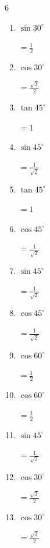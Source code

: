 \begin{multicols}{6}
\begin{enumerate}
  \item $\displaystyle \sin{30^\circ}$

        $\displaystyle =\frac{1}{2}$

  \item $\displaystyle \cos{30^\circ}$

        $\displaystyle =\frac{\sqrt{3}}{2}$

  \item $\displaystyle \tan{45^\circ}$

        $\displaystyle =1$

  \item $\displaystyle \sin{45^\circ}$

        $\displaystyle =\frac{1}{\sqrt{2}}$

  \item $\displaystyle \tan{45^\circ}$

        $\displaystyle =1$

  \item $\displaystyle \cos{45^\circ}$

        $\displaystyle =\frac{1}{\sqrt{2}}$

  \item $\displaystyle \sin{45^\circ}$

        $\displaystyle =\frac{1}{\sqrt{2}}$

  \item $\displaystyle \cos{45^\circ}$

        $\displaystyle =\frac{1}{\sqrt{2}}$

  \item $\displaystyle \cos{60^\circ}$

        $\displaystyle =\frac{1}{2}$

  \item $\displaystyle \cos{60^\circ}$

        $\displaystyle =\frac{1}{2}$

  \item $\displaystyle \sin{45^\circ}$

        $\displaystyle =\frac{1}{\sqrt{2}}$

\columnbreak %

  \item $\displaystyle \cos{30^\circ}$

        $\displaystyle =\frac{\sqrt{3}}{2}$

  \item $\displaystyle \cos{30^\circ}$

        $\displaystyle =\frac{\sqrt{3}}{2}$


\end{enumerate}
\end{multicols}
